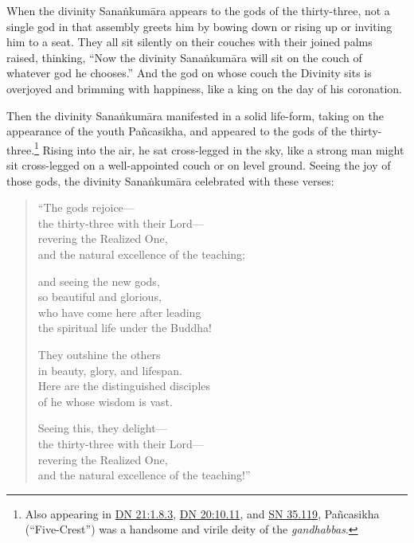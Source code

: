 \documentclass[12pt,openany]{book}%
\begin{document}
When the divinity \textsanskrit{Sanaṅkumāra} appears to the gods of the thirty-three, not a single god in that assembly greets him by bowing down or rising up or inviting him to a seat. They all sit silently on their couches with their joined palms raised, thinking, “Now the divinity \textsanskrit{Sanaṅkumāra} will sit on the couch of whatever god he chooses.” And the god on whose couch the Divinity sits is overjoyed and brimming with happiness, like a king on the day of his coronation. 

Then the divinity \textsanskrit{Sanaṅkumāra} manifested in a solid life-form, taking on the appearance of the youth \textsanskrit{Pañcasikha}, and appeared to the gods of the thirty-three.\footnote{Also appearing in \href{https://suttacentral.net/dn21/en/sujato\#1.8.3}{DN 21:1.8.3}, \href{https://suttacentral.net/dn20/en/sujato\#10.11}{DN 20:10.11}, and \href{https://suttacentral.net/sn35.119/en/sujato}{SN 35.119}, \textsanskrit{Pañcasikha} (“Five-Crest”) was a handsome and virile deity of the \textit{gandhabbas}. } Rising into the air, he sat cross-legged in the sky, like a strong man might sit cross-legged on a well-appointed couch or on level ground. Seeing the joy of those gods, the divinity \textsanskrit{Sanaṅkumāra} celebrated with these verses: 

\begin{verse}%
“The gods rejoice—\\
the thirty-three with their Lord—\\
revering the Realized One, \\
and the natural excellence of the teaching; 

and seeing the new gods, \\
so beautiful and glorious, \\
who have come here after leading \\
the spiritual life under the Buddha! 

They outshine the others \\
in beauty, glory, and lifespan. \\
Here are the distinguished disciples \\
of he whose wisdom is vast. 

Seeing this, they delight—\\
the thirty-three with their Lord—\\
revering the Realized One, \\
and the natural excellence of the teaching!” 

%
\end{verse}
\end{document}
